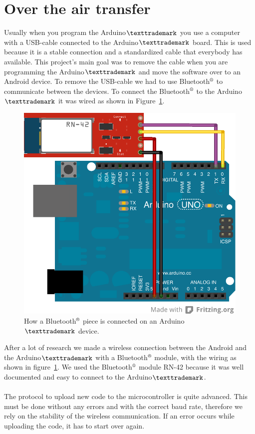 \section{Over the air transfer}
\label{sec:SimpleArduinoWiring}
Usually when you program the Arduino$\texttrademark$ you use a computer with a USB-cable connected to the Arduino$\texttrademark$ board. This is used because it is a stable connection and a standardized cable that everybody has available. This project's main goal was to remove the cable when you are programming the Arduino$\texttrademark$ and move the software over to an Android device. To remove the USB-cable we had to use Bluetooth$\textsuperscript{\textregistered}$ to communicate between the devices. To connect the Bluetooth$\textsuperscript{\textregistered}$ to the Arduino$\texttrademark$ it was wired as shown in Figure~\ref{fig:SimpleArduinoWiring}.
\\
\begin{figure}[H]
\centering
\includegraphics[scale=1.2]{images/wiring_simple.png}
\caption[Wiring Diagram for BT module]{How a Bluetooth$\textsuperscript{\textregistered}$ piece is connected on an Arduino$\texttrademark$ device.}
\label{fig:SimpleArduinoWiring}
\end{figure}

After a lot of research we made a wireless connection between the Android and the Arduino$\texttrademark$ with a Bluetooth$\textsuperscript{\textregistered}$ module, with the wiring as shown in figure~\ref{fig:SimpleArduinoWiring}. We used the Bluetooth$\textsuperscript{\textregistered}$ module RN-42 \cite{rn-42} because it was well documented and easy to connect to the Arduino$\texttrademark$.\\
\\
The protocol to upload new code to the microcontroller is quite advanced. This must be done without any errors and with the correct baud rate, therefore we rely on the stability of the wireless communication. If an error occurs while uploading the code, it has to start over again.
